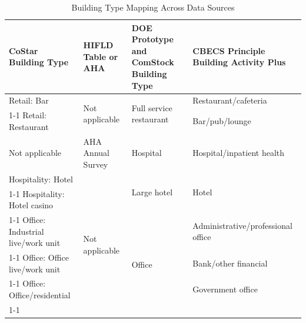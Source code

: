 \begin{table}
\centering
\small
\caption[Building Type Mapping Across Data Sources]{Building Type Mapping Across Data Sources}
\label{tab:building_types}
\begin{tabular}{|p{4.25cm}|p{3.5cm}|p{3.25cm}|p{4.25cm}|}
\hline
\textbf{CoStar Building   Type}                                & \multicolumn{1}{l|}{\textbf{HIFLD Table or AHA}}                & \textbf{DOE Prototype and ComStock Building Type}                               & \textbf{CBECS Principle Building Activity Plus }         \\ \hline
Retail:   Bar                                         & \multirow{2}{*}{Not applicable}                 & \multirow{2}{*}{Full service restaurant}  & Restaurant/cafeteria                            \\ \cline{1-1} \cline{4-4}
Retail: Restaurant                                    &                                                 &                                           & Bar/pub/lounge                                  \\ \hline
\multicolumn{1}{|l|}{Not applicable}                  & \multicolumn{1}{l|}{AHA Annual Survey}          & Hospital                                  & Hospital/inpatient health                       \\ \hline
Hospitality: Hotel                                    & \multirow{12}{*}{Not applicable}                & \multirow{2}{*}{Large hotel}              & \multirow{2}{*}{Hotel}                          \\ \cline{1-1}
Hospitality: Hotel casino                             &                                                 &                                           &                                                 \\ \cline{1-1} \cline{3-4}
Office: Industrial live/work   unit                   &                                                 & \multirow{6}{*}{Office}                   & Administrative/professional office              \\ \cline{1-1} \cline{4-4}
Office: Office live/work unit                         &                                                 &                                           & Bank/other financial                            \\ \cline{1-1} \cline{4-4}
Office: Office/residential                            &                                                 &                                           & Government office                               \\ \cline{1-1} \cline{4-4}

\end{tabular}
\end{table}
